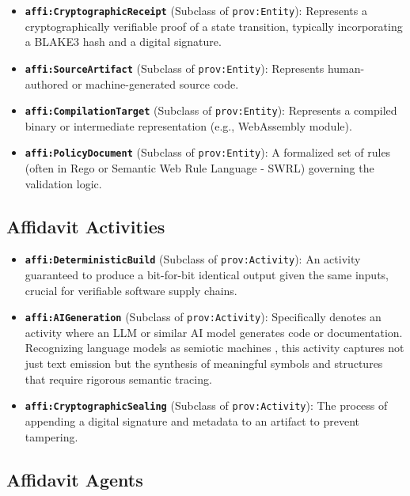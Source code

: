 \begin{itemize}
    \item \textbf{\texttt{affi:CryptographicReceipt}} (Subclass of \texttt{prov:Entity}): Represents a cryptographically verifiable proof of a state transition, typically incorporating a BLAKE3 hash and a digital signature.
    \item \textbf{\texttt{affi:SourceArtifact}} (Subclass of \texttt{prov:Entity}): Represents human-authored or machine-generated source code.
    \item \textbf{\texttt{affi:CompilationTarget}} (Subclass of \texttt{prov:Entity}): Represents a compiled binary or intermediate representation (e.g., WebAssembly module).
    \item \textbf{\texttt{affi:PolicyDocument}} (Subclass of \texttt{prov:Entity}): A formalized set of rules (often in Rego or Semantic Web Rule Language - SWRL) governing the validation logic.
\end{itemize}

\subsection{Affidavit Activities}

\begin{itemize}
    \item \textbf{\texttt{affi:DeterministicBuild}} (Subclass of \texttt{prov:Activity}): An activity guaranteed to produce a bit-for-bit identical output given the same inputs, crucial for verifiable software supply chains.
    \item \textbf{\texttt{affi:AIGeneration}} (Subclass of \texttt{prov:Activity}): Specifically denotes an activity where an LLM or similar AI model generates code or documentation. Recognizing language models as semiotic machines \cite{ref_LanguageModelsa26}, this activity captures not just text emission but the synthesis of meaningful symbols and structures that require rigorous semantic tracing.
    \item \textbf{\texttt{affi:CryptographicSealing}} (Subclass of \texttt{prov:Activity}): The process of appending a digital signature and metadata to an artifact to prevent tampering.
\end{itemize}

\subsection{Affidavit Agents}

